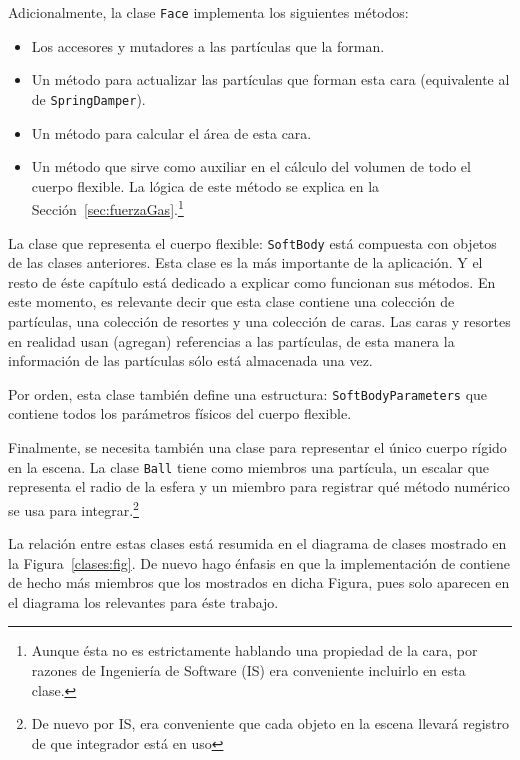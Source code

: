 Adicionalmente, la clase \texttt{Face} implementa los siguientes métodos:
\begin{itemize}
 \item Los accesores y mutadores a las partículas que la forman.
 \item Un método para actualizar las partículas que forman esta cara (equivalente al de \texttt{SpringDamper}).
 \item Un método para calcular el área de esta cara.
 \item Un método que sirve como auxiliar en el cálculo del volumen de todo el cuerpo flexible. La lógica de este método se explica en la Sección~\ref{sec:fuerzaGas}.\footnote{Aunque ésta no es estrictamente hablando una propiedad de la cara, por razones de Ingeniería de Software (IS) era conveniente incluirlo en esta clase.}
\end{itemize}

La clase que representa el cuerpo flexible: \texttt{SoftBody} está compuesta con objetos de las clases anteriores.
Esta clase es la más importante de la aplicación.
Y el resto de éste capítulo está dedicado a explicar como funcionan sus métodos.
En este momento, es relevante decir que esta clase contiene una colección de partículas, una colección de resortes y una colección de caras.
Las caras y resortes en realidad usan (agregan) referencias a las partículas, de esta manera la información de las partículas sólo está almacenada una vez.

Por orden, esta clase también define una estructura: \texttt{SoftBodyParameters} que contiene todos los parámetros físicos del cuerpo flexible. 
 
Finalmente, se necesita también una clase para representar el único cuerpo rígido en la escena.
La clase \texttt{Ball} tiene como miembros una partícula, un escalar que representa el radio de la esfera y un miembro para registrar qué método numérico se usa para integrar.\footnote{De nuevo por IS, era conveniente que cada objeto en la escena llevará registro de que integrador está en uso}

La relación entre estas clases está resumida en el diagrama de clases mostrado en la Figura~\ref{clases:fig}. De nuevo hago énfasis en que la implementación de contiene de hecho más miembros que los mostrados en dicha Figura, pues solo aparecen en el diagrama los relevantes para éste trabajo.

